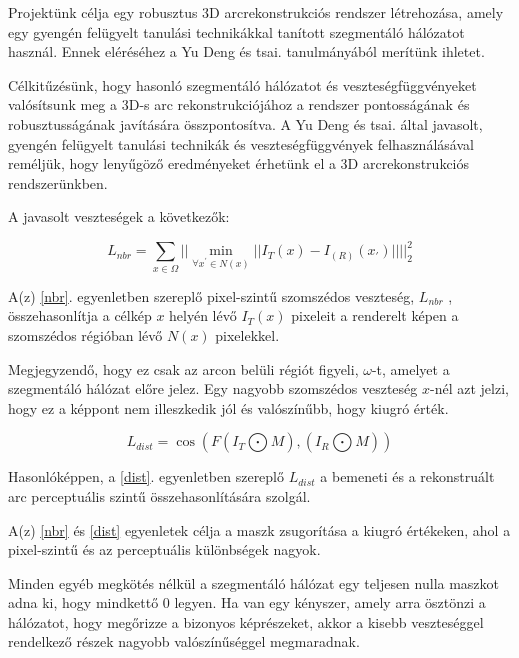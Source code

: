 \documentclass[12pt,a4]{article}
\begin{document}
            Projektünk célja egy robusztus 3D arcrekonstrukciós rendszer létrehozása, amely egy gyengén felügyelt tanulási technikákkal tanított szegmentáló hálózatot használ. Ennek eléréséhez a Yu Deng és tsai. \cite{focus} tanulmányából merítünk ihletet. 

            Célkitűzésünk, hogy hasonló szegmentáló hálózatot és veszteségfüggvényeket valósítsunk meg a 3D-s arc rekonstrukciójához a rendszer pontosságának és robusztusságának javítására összpontosítva. A Yu Deng és tsai. \cite{focus} által javasolt, gyengén felügyelt tanulási technikák és veszteségfüggvények felhasználásával reméljük, hogy lenyűgöző eredményeket érhetünk el a 3D arcrekonstrukciós rendszerünkben.

            A javasolt veszteségek a következők:

            \begin{equation}
                \label{nbr}
                L_{nbr} = \sum_{x \in \Omega}\Big|\Big|\min_{\forall x^{'} \in N(x)}||I_{T}(x)-I_(R)(x_{'})||\Big|\Big|_{2}^{2}
            \end{equation}

            A(z) \ref{nbr}. egyenletben szereplő pixel-szintű szomszédos veszteség, $L_{nbr}$ , összehasonlítja a célkép $x$ helyén lévő $I_{T}(x)$ pixeleit a renderelt képen a szomszédos régióban lévő $N(x)$ pixelekkel. 

            Megjegyzendő, hogy ez csak az arcon belüli régiót figyeli, $\omega$-t, amelyet a szegmentáló hálózat előre jelez. Egy nagyobb szomszédos veszteség $x$-nél azt jelzi, hogy ez a képpont nem illeszkedik jól és valószínűbb, hogy kiugró érték.
                

            \begin{equation}\label{dist}
                L_{dist} = \cos(F(I_{T} \bigodot M),(I_{R} \bigodot M))  
            \end{equation}

            Hasonlóképpen, a \ref{dist}. egyenletben szereplő $L_{dist}$ a bemeneti és a rekonstruált arc perceptuális szintű összehasonlítására szolgál.

            A(z) \ref{nbr} és \ref{dist} egyenletek célja a maszk zsugorítása a kiugró értékeken, ahol a pixel-szintű és az perceptuális különbségek nagyok.

            Minden egyéb megkötés nélkül a szegmentáló hálózat egy teljesen nulla maszkot adna ki, hogy mindkettő 0 legyen. Ha van egy kényszer, amely arra ösztönzi a hálózatot, hogy megőrizze a bizonyos képrészeket, akkor a kisebb veszteséggel rendelkező részek nagyobb valószínűséggel megmaradnak.
\end{document}
